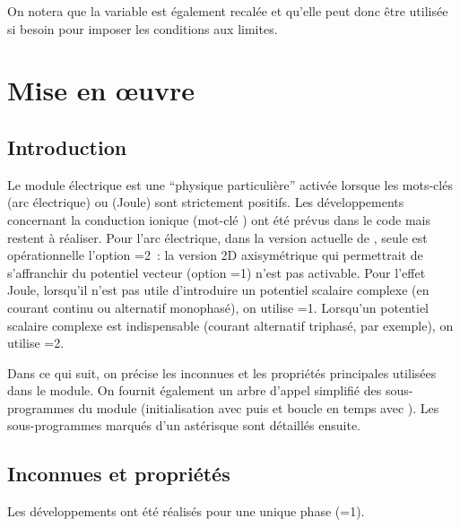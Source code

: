 \bigskip
On notera que la variable  est également recalée et qu'elle
peut donc être utilisée si besoin pour imposer les conditions aux limites.

\section*{Mise en \oe uvre}


\subsection*{Introduction}

Le module électrique est une ``physique particulière'' activée lorsque les
mots-clés  (arc électrique) ou 
(Joule) sont strictement positifs. Les développements concernant la conduction ionique
(mot-clé ) ont été prévus dans le code mais restent à
réaliser. Pour l'arc électrique, dans la version actuelle
de \CS, seule est opérationnelle l'option =2~: la version 2D axisymétrique qui permettrait de
        s'affranchir du potentiel vecteur (option =1) n'est pas
        activable.
Pour l'effet Joule, lorsqu'il n'est pas utile d'introduire un potentiel scalaire
complexe
(en courant continu ou alternatif monophasé), on utilise
=1. Lorsqu'un potentiel scalaire complexe est indispensable (courant
alternatif triphasé, par exemple), on utilise
=2.

Dans ce qui suit, on précise les inconnues et les propriétés
principales utilisées dans le module.
On fournit également un arbre d'appel simplifié des sous-programmes du module
(initialisation avec  puis  et boucle en temps avec ).
Les sous-programmes marqués d'un astérisque sont détaillés ensuite.

\newpage

\subsection*{Inconnues et propriétés}

Les développements ont été réalisés pour une unique phase (=1).

